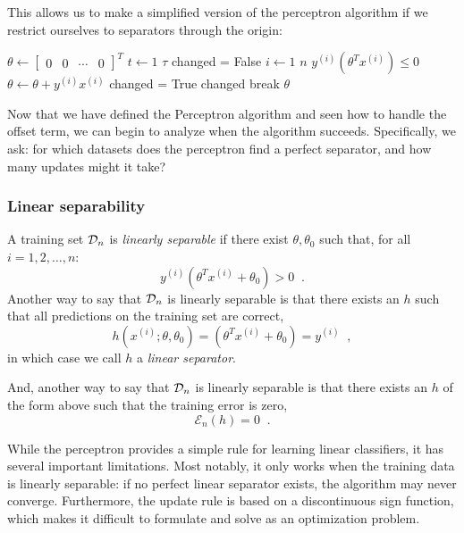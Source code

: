 \documentclass[11pt]{article}
\newcommand\ex[2]{#1^{(#2)}}
\newcommand\dataTrain{{\cal D}_n}
\newcommand{\trainerr}{\mathcal{E}_n}
\begin{document}
This allows us to make a simplified version of the perceptron algorithm if we restrict ourselves to separators through the origin: 

\begin{codebox}
  \Procname{$\proc{Perceptron-Through-Origin}(\tau, \dataTrain)$}
  \li $\theta \gets 
    \begin{bmatrix}
      0 & 0 & \cdots & 0
    \end{bmatrix}^T$
  \li \For $t \gets 1$ \To $\tau$
  \li   \Do
          changed = False
  \li      \For $i \gets 1$ \To $n$
  \li       \Do
              \If $\ex{y}{i}\left(\theta^T\ex{x}{i}\right) \le 0$
  \li           \Then
                  $\theta \gets \theta + \ex{y}{i}\ex{x}{i}$
  \li             changed = True
                \End
            \End
  \li      {} changed
  \li          \Then
		  break
      \End
  \li \Return $\theta$
\end{codebox}


Now that we have defined the Perceptron algorithm and seen how to handle the offset term, we can begin to analyze when the algorithm succeeds. Specifically, we ask: for which datasets does the perceptron find a perfect separator, and how many updates might it take?

\subsubsection*{Linear separability}
A training set $\dataTrain$ is {\em{linearly separable}} if there exist
$\theta, \theta_0$ such that, for all $i = 1, 2, \dots, n$: 
$$ \ex{y}{i}\left(\theta^T\ex{x}{i} + \theta_0\right) > 0 \;\;.$$
Another way to say that $\dataTrain$ is linearly separable
is that there exists an $h$ such that all predictions on the training set
are correct,
$$ h(\ex{x}{i}; \theta, \theta_0) = \left(\theta^T\ex{x}{i} + \theta_0\right) =
\ex{y}{i} \;\;,$$
in which case we call $h$ a {\em linear separator}.

And, another way to say that $\dataTrain$ is linearly separable
is that there exists an $h$ of the form above such that
the training error is zero,
$$\trainerr(h) = 0 \;\;.$$

While the perceptron provides a simple rule for learning linear classifiers, it has several important limitations. Most notably, it only works when the training data is linearly separable: if no perfect linear separator exists, the algorithm may never converge. Furthermore, the update rule is based on a discontinuous sign function, which makes it difficult to formulate and solve as an optimization problem.
\end{document}
